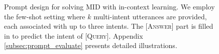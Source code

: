 \begin{figure}[t]
    \setlength{\fboxsep}{7pt} 
    \noindent{}
    \caption{Prompt design for solving MID with in-context learning. 
    We employ the few-shot setting where $k$ multi-intent utterances are provided, each associated with up to three intents. 
    The \textsc{[Answer]} part is filled in to predict the intent of \textsc{[Query]}. 
    Appendix \ref{subsec:prompt_evaluate} presents detailed illustrations.}
    \label{figure:prompt_chatgpt_figure}
\end{figure}

